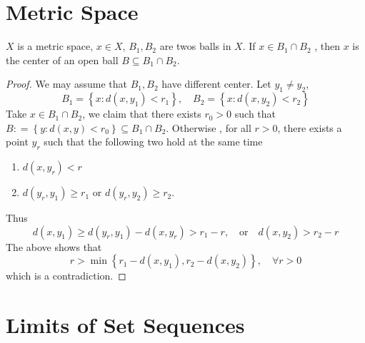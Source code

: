 \documentclass[../main.tex]{subfiles}
\begin{document}
\section{Metric Space}
\begin{lemma}{}{}
    \(  X  \) is a metric space, \(  x \in X  \), \(  B_1,B_2  \) are twos balls in \(  X  \). If \(  x  \in B_1\cap B_2  \) , then \(  x  \) is the center of an open ball \(  B\subseteq  B_1\cap B_2  \).       
\end{lemma}
\begin{proof}
    We may assume that \(  B_1,B_2  \) have  different center. Let  \(  y_1\neq y_2  \), \[
B_1= \left\{ x: d\left( x,y_1 \right)< r_1  \right\},\quad B_2= \left\{ x:d\left( x,y_2 \right)< r_2  \right\}
\] 
Take  \(  x \in B_1\cap B_2  \), we claim that there exists  \(  r_0> 0  \) such that  \(  B: =  \left\{ y: d\left( x,y \right)< r_0  \right\}\subseteq B_1\cap B_2  \). Otherwise , for all \(  r > 0 \),  there exists a point \(  y_{r}  \) such that   the following two hold at the same time \begin{enumerate}
    \item \(  d\left( x,y_{r} \right)< r   \)
    \item \(  d\left( y_{r},y_1 \right)\ge r_1   \) or \(  d\left( y_{r},y_2 \right)\ge r_2   \).   
\end{enumerate}
Thus \[
d\left( x,y_1 \right)\ge d\left( y_{r},y_1 \right)-d\left( x,y_{r} \right)>  r_1-r   ,\quad  \text{or} \quad  d\left( x,y_2 \right)> r_2-r 
\] The above shows that \[
r> \min \left\{ r_1-d\left( x,y_1 \right),r_2-d\left( x,y_2 \right)   \right\},\quad \forall r> 0
\] which is a contradiction.
\end{proof}

\section{Limits of Set Sequences}
\end{document}
